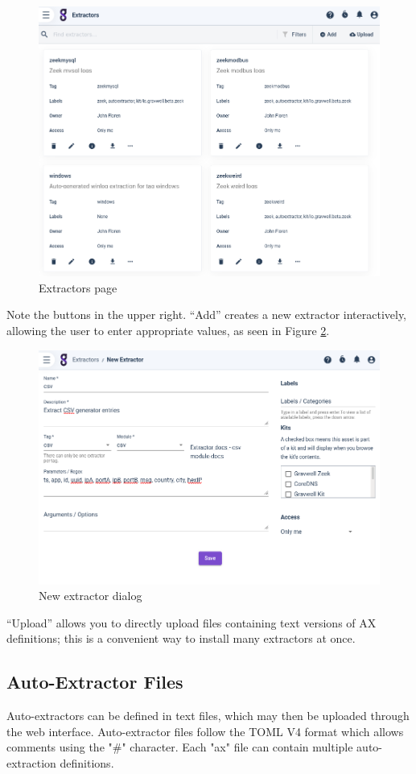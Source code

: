 \begin{figure}
	\includegraphics[width=0.7\linewidth]{images/extractors-page.png}
	\caption{Extractors page}
	\label{fig:extractors-page}
\end{figure}

Note the buttons in the upper right. ``Add'' creates a new extractor
interactively, allowing the user to enter appropriate values, as seen in Figure \ref{fig:new-extractor}.

\begin{figure}
	\includegraphics[width=0.7\linewidth]{images/new-extractor.png}
	\caption{New extractor dialog}
	\label{fig:new-extractor}
\end{figure}

``Upload'' allows you to directly upload files containing text versions of AX definitions; this is a convenient way to install many extractors at once.

\subsection{Auto-Extractor Files}

Auto-extractors can be defined in text files, which may then be uploaded through
the web interface. Auto-extractor files follow the TOML V4 format which allows comments
using the "\#" character. Each "ax" file can contain multiple
auto-extraction definitions.

